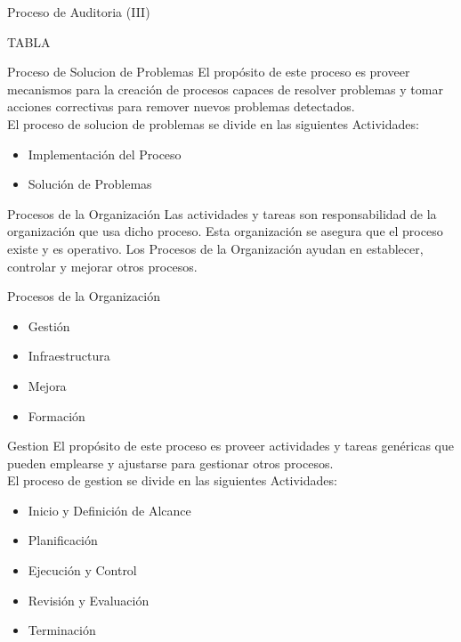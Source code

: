 \documentclass{beamer}
\begin{document}
			\begin{frame}{Proceso de Auditoria (III)}
			
			\huge TABLA
			
			\end{frame}
			
			\begin{frame}{Proceso de Solucion de Problemas}
				El propósito de este proceso es proveer mecanismos para la creación de procesos capaces de resolver problemas y tomar acciones correctivas para remover nuevos problemas detectados.\\
				
				El proceso de solucion de problemas se divide en las siguientes Actividades:
				
				\begin{itemize}
					\item Implementación del Proceso
					\item Solución de Problemas
				\end{itemize}			 
			\end{frame}
			
			\begin{frame}{Procesos de la Organización}
				Las actividades y tareas son responsabilidad de la organización que usa dicho proceso. Esta organización se asegura que el proceso existe y es operativo. Los Procesos de la Organización ayudan en establecer, controlar y mejorar otros procesos.
			\end{frame}
			
			\begin{frame}{Procesos de la Organización}
				\begin{itemize}
					\item Gestión
					\item Infraestructura
					\item Mejora
					\item Formación
				\end{itemize}
			\end{frame}
			
			
			\begin{frame}{Gestion}
			El propósito de este proceso es proveer actividades y tareas genéricas que pueden emplearse y ajustarse para gestionar otros procesos.\\
					
					El proceso de gestion se divide en las siguientes Actividades:					
					\begin{itemize}
						\item Inicio y Definición de Alcance
						\item Planificación
						\item Ejecución y Control
						\item Revisión y Evaluación
						\item Terminación
					\end{itemize}
			\end{frame}
			
\end{document}
